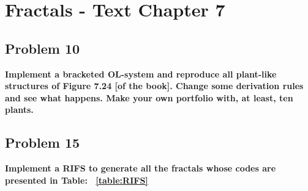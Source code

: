 
\chapter{Fractals - Text Chapter 7}

\section{Problem 10}
\textbf{ Implement a bracketed OL-system and reproduce all plant-like structures of Figure 7.24 [of the book]. Change some derivation rules and see what happens. Make your own portfolio with, at least, ten plants. }

\section{Problem 15}
\textbf{ Implement a RIFS to generate all the fractals whose codes are presented in Table: ~\ref{table:RIFS} }

